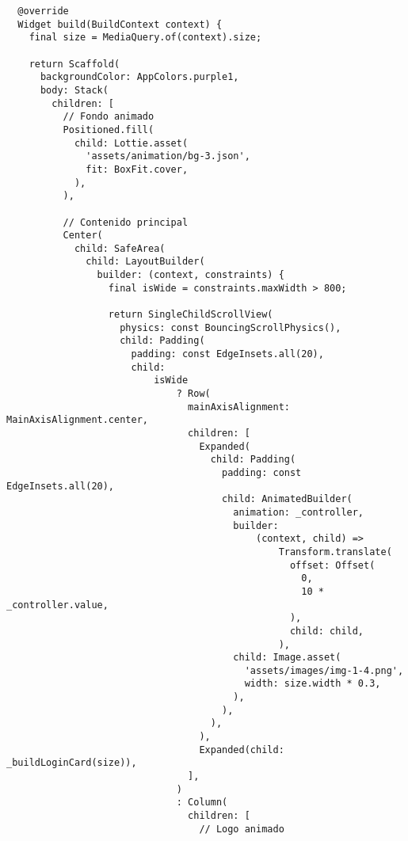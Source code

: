 \begin{verbatim}
  @override
  Widget build(BuildContext context) {
    final size = MediaQuery.of(context).size;

    return Scaffold(
      backgroundColor: AppColors.purple1,
      body: Stack(
        children: [
          // Fondo animado
          Positioned.fill(
            child: Lottie.asset(
              'assets/animation/bg-3.json',
              fit: BoxFit.cover,
            ),
          ),

          // Contenido principal
          Center(
            child: SafeArea(
              child: LayoutBuilder(
                builder: (context, constraints) {
                  final isWide = constraints.maxWidth > 800;

                  return SingleChildScrollView(
                    physics: const BouncingScrollPhysics(),
                    child: Padding(
                      padding: const EdgeInsets.all(20),
                      child:
                          isWide
                              ? Row(
                                mainAxisAlignment: MainAxisAlignment.center,
                                children: [
                                  Expanded(
                                    child: Padding(
                                      padding: const EdgeInsets.all(20),
                                      child: AnimatedBuilder(
                                        animation: _controller,
                                        builder:
                                            (context, child) =>
                                                Transform.translate(
                                                  offset: Offset(
                                                    0,
                                                    10 * _controller.value,
                                                  ),
                                                  child: child,
                                                ),
                                        child: Image.asset(
                                          'assets/images/img-1-4.png',
                                          width: size.width * 0.3,
                                        ),
                                      ),
                                    ),
                                  ),
                                  Expanded(child: _buildLoginCard(size)),
                                ],
                              )
                              : Column(
                                children: [
                                  // Logo animado

\end{verbatim}
